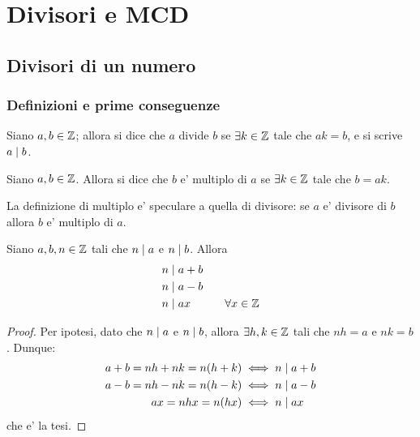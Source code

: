 \chapter{Divisori e MCD}

\section{Divisori di un numero}

\subsection{Definizioni e prime conseguenze}

\begin{definition}
    Siano $a, b \in \mathbb{Z}$; allora si dice che $a$ divide $b$ se
    $\exists k \in \mathbb{Z}$ tale che $ak = b$, e si scrive $a \mid b$.
\end{definition}

\begin{definition}
    Siano $a, b \in \mathbb{Z}$. Allora si dice che $b$ e' multiplo di $a$ se $\exists k \in \mathbb{Z}$ tale che $b = ak$.
\end{definition}
\begin{remark}
    La definizione di multiplo e' speculare a quella di divisore: se $a$ e' divisore di $b$ allora $b$ e' multiplo di $a$.
\end{remark}

\begin{proposition} \label{divides_sum_subtr_mult}
    Siano $a, b, n \in \mathbb{Z}$ tali che $n \mid a$ e $n \mid b$. Allora
    \begin{alignat}{2}
        &n \mid a + b \label{divides_sum}\\
        &n \mid a - b \label{divides_subtr} \\
        &n \mid ax \qquad&\forall x \in \mathbb{Z} \label{divides_mult}
    \end{alignat} 
\end{proposition}
\begin{proof}  
    Per ipotesi, dato che $n \mid a$ e $n \mid b$, allora $\exists h, k \in \mathbb{Z}$ tali che
    $nh = a$ e $nk = b$. Dunque:
    \begin{alignat*}{2}
        a + b = nh + nk = n(h + k) &\iff n \mid a + b \\
        a - b = nh - nk = n(h - k) &\iff n \mid a - b \\
        ax = nhx = n(hx) &\iff n \mid ax
    \end{alignat*}
    che e' la tesi.
\end{proof}

